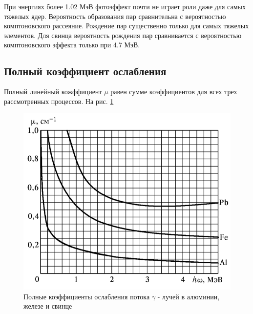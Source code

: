 \documentclass[a4paper]{article}
\begin{document}
При энергиях более 1.02 МэВ фотоэффект почти не играет роли даже для самых тяжелых ядер. Вероятность образования пар 
сравнительна с вероятностью комптоновского рассеяние. Рождение пар существенно только для самых тяжелых элементов. 
Для свинца вероятность рождения пар сравнивается с вероятностью комптоновского эффекта только при 4.7 МэВ.



\subsection{Полный коэффициент ослабления}

Полный линейный кожффициент $\mu$ равен сумме коэффициентов для всех трех рассмотренных процессов.
На рис. \ref{p2}

\begin{figure}[H]
    \begin{center}
    \includegraphics[scale = 0.8]{p2.png}
    \caption{Полные коэффициенты ослабления потока $\gamma$ - лучей в алюминии, железе и свинце}
    \label{p2}
    \end{center}
\end{figure}
\end{document}
